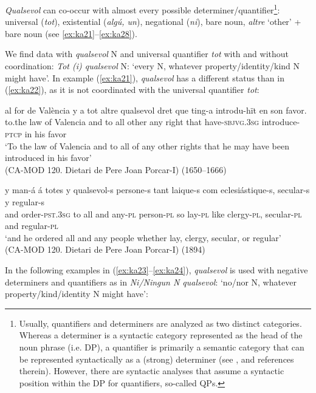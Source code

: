\documentclass[output=paper,colorlinks,citecolor=brown]{langscibook}
\begin{document}
\textit{Qualsevol} can co-occur with almost every possible determiner/quantifier\footnote{Usually, quantifiers and determiners are analyzed as two distinct categories. Whereas a determiner is a syntactic category represented as the head of the noun phrase (i.e. DP), a quantifier is primarily a semantic category that can be represented syntactically as a (strong) determiner (see \cite{Zamparelli2000}, and references therein). However, there are syntactic analyses that assume a syntactic position within the DP for quantifiers, so-called QPs.}: universal (\textit{tot}), existential (\textit{algú, un}), negational (\textit{ni}), bare noun, \textit{altre} ‘other’ + bare noun (see \ref{ex:ka21}--\ref{ex:ka28}).

We find data with \textit{qualsevol} N and universal quantifier \textit{tot} with and without coordination: \textit{Tot (i) qualsevol} N: ‘every N, whatever property/identity/kind N might have’. In example (\ref{ex:ka21}), \textit{qualsevol} has a different status than in (\ref{ex:ka22}), as it is not coordinated with the universal quantifier \textit{tot}:
	
\ea \label{ex:ka21}
    \gll al for de València y a tot altre qualsevol dret que ting-a introdu-hït en son favor.\\
    to.the law of Valencia and to all other any right that have-\textsc{sbjvg.3sg} introduce-\textsc{ptcp} in his favor\\
    \glt ‘To the law of Valencia and to all of any other rights that he may have been introduced in his favor’\\
    (CA-MOD 120. Dietari de Pere Joan Porcar-I) (1650--1666)    
    
    \ex \label{ex:ka22} 
    \gll y man-á á totes y qualsevol-s persone-s tant laique-s com eclesiástique-s, secular-s y regular-s\\
    and order-\textsc{pst.3sg} to all and any-\textsc{pl} person-\textsc{pl} so lay-\textsc{pl} like clergy-\textsc{pl}, secular-\textsc{pl} and regular-\textsc{pl}\\
    \glt ‘and he ordered all and any people whether lay, clergy, secular, or regular’\\
    (CA-MOD 120. Dietari de Pere Joan Porcar-I) (1894)\\
\z

In the following examples in (\ref{ex:ka23}--\ref{ex:ka24}), \textit{qualsevol} is used with negative determiners and quantifiers as in \textit{Ni/Ningun N qualsevol}: ‘no/nor N, whatever property/kind/identity N might have’:
\end{document}
